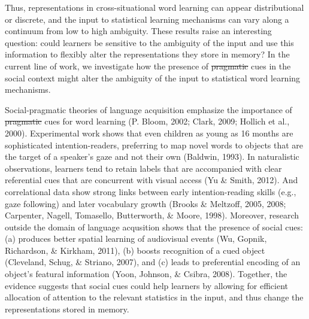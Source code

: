 \documentclass[authoryear, review]{elsarticle}
\providecommand{\DIFaddtex}[1]{{\protect\color{blue}\uwave{#1}}} %
\providecommand{\DIFdeltex}[1]{{\protect\color{red}\sout{#1}}}                      %
\providecommand{\DIFaddbegin}{} %
\providecommand{\DIFaddend}{} %
\providecommand{\DIFdelbegin}{} %
\providecommand{\DIFdelend}{} %
\providecommand{\DIFadd}[1]{\texorpdfstring{\DIFaddtex{#1}}{#1}} %
\providecommand{\DIFdel}[1]{\texorpdfstring{\DIFdeltex{#1}}{}} %
\begin{document}
Thus, representations in cross-situational word learning can appear
distributional or discrete, and the input to statistical learning
mechanisms can vary along a continuum from low to high ambiguity. These
results raise an interesting question: could learners be sensitive to
the ambiguity of the input and use this information to flexibly alter
the representations they store in memory? In the current line of work,
we investigate how the presence of \DIFdelbegin \DIFdel{pragmatic }\DIFdelend \DIFaddbegin \DIFadd{referential }\DIFaddend cues in the social
context might alter the ambiguity of the input to statistical word
learning mechanisms.

Social-pragmatic theories of language acquisition emphasize the
importance of \DIFdelbegin \DIFdel{pragmatic }\DIFdelend \DIFaddbegin \DIFadd{social }\DIFaddend cues for word learning (P. Bloom, 2002; Clark,
2009; Hollich et al., 2000). Experimental work shows that even children
as young as 16 months are sophisticated intention-readers, preferring to
map novel words to objects that are the target of a speaker's gaze and
not their own (Baldwin, 1993). In naturalistic observations, learners
tend to retain labels that are accompanied with clear referential cues
that are concurrent with visual access (Yu \& Smith, 2012). And
correlational data show strong links between early intention-reading
skills (e.g., gaze following) and later vocabulary growth (Brooks \&
Meltzoff, 2005, 2008; Carpenter, Nagell, Tomasello, Butterworth, \&
Moore, 1998). Moreover, research outside the domain of language
acqusition shows that the presence of social cues: (a) produces better
spatial learning of audiovisual events (Wu, Gopnik, Richardson, \&
Kirkham, 2011), (b) boosts recognition of a cued object (Cleveland,
Schug, \& Striano, 2007), and (c) leads to preferential encoding of an
object's featural information (Yoon, Johnson, \& Csibra, 2008).
Together, the evidence suggests that social cues could help learners by
allowing for efficient allocation of attention to the relevant
statistics in the input, and thus change the representations stored in
memory.
\end{document}
